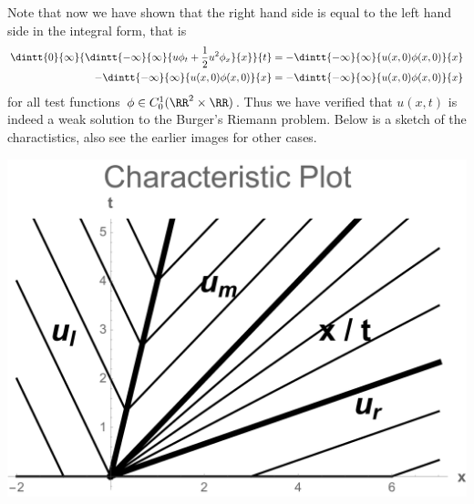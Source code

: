 \documentclass[11pt, oneside]{article}
\begin{document}
\begin{enumerate}
    Note that now we have shown that the right hand side is equal to the left
    hand side in the integral form, that is
    \begin{align*}
      \dintt{0}{\infty}{\dintt{-\infty}{\infty}{u \phi_t + \frac{1}{2} u^2 \phi_x}{x}}{t} &= -\dintt{-\infty}{\infty}{u(x,0) \phi(x, 0)}{x} \\
      -\dintt{-\infty}{\infty}{u(x,0) \phi(x, 0)}{x} &= -\dintt{-\infty}{\infty}{u(x,0) \phi(x, 0)}{x}
    \end{align*}
    for all test functions $\phi \in C^1_0(\RR^2 \times \RR)$.
    Thus we have verified that $u(x, t)$ is indeed a weak solution to the
    Burger's Riemann problem.
    Below is a sketch of the charactistics, also see the earlier images for
    other cases.
    \begin{center}
      \includegraphics[scale=.6]{Figures/01_07.pdf}
    \end{center}


\end{enumerate}
\end{document}
